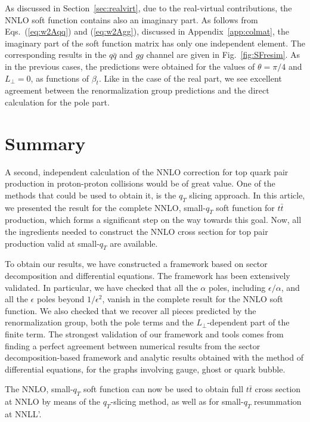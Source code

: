 \documentclass[a4paper,11pt]{article}
\newcommand{\ttbar}{\ensuremath{t \bar t}\xspace}
\newcommand{\qqbar}{{\ensuremath{q \bar q}}\xspace}
\newcommand{\LT}{L_\perp}
\numberwithin{equation}{section}
\begin{document}
As discussed in Section~\ref{sec:realvirt}, due to the real-virtual
contributions, the NNLO soft function contains also an imaginary part.  As
follows from Eqs.~(\ref{eq:w2Aqq}) and (\ref{eq:w2Agg}), discussed in
Appendix~\ref{app:colmat}, the imaginary part of the soft function matrix has
only one independent element.  The corresponding results in the \qqbar and $gg$
channel are given in Fig.~\ref{fig:SFresim}. As in the previous cases, the
predictions were obtained for the values of $\theta = \pi/4$ and $\LT = 0$, as
functions of $\beta_t$. 
%
Like in the case of the real part,  we see excellent agreement
between the renormalization group predictions and the direct calculation for the
pole part.

\section{Summary}

A second, independent calculation of the NNLO correction for top quark pair
production in proton-proton collisions would be of great value.
%
One of the methods that could be used to obtain it, is the $q_T$ slicing
approach.
%
In this article, we presented 
the result for the complete NNLO, small-$q_T$ soft function for \ttbar
production, which  forms a significant step on the way towards
this goal.
%
Now, all the ingredients needed to construct the NNLO cross section for top pair
production valid at small-$q_T$ are available.

To obtain our results, we have constructed a framework based on sector
decomposition and differential equations. The framework has been extensively
validated. In particular, we have checked that all the $\alpha$
poles, including $\epsilon/\alpha$, and all the $\epsilon$ poles beyond
$1/\epsilon^2$, vanish in the complete result for the NNLO soft function.
%
We also checked that we recover all pieces predicted by the renormalization
group, both the pole terms and the $\LT$-dependent part of the finite term.
%
The strongest validation of our framework and tools comes from 
finding a perfect agreement between numerical results from
the sector decomposition-based framework and analytic results obtained with the
method of differential equations, for the graphs
involving gauge, ghost or quark bubble.

The NNLO, small-$q_T$ soft function  can now be used to obtain full $t\bar t$
cross section at NNLO by means of the $q_T$-slicing method, as well as for
small-$q_T$ resummation at NNLL'.
\end{document}
